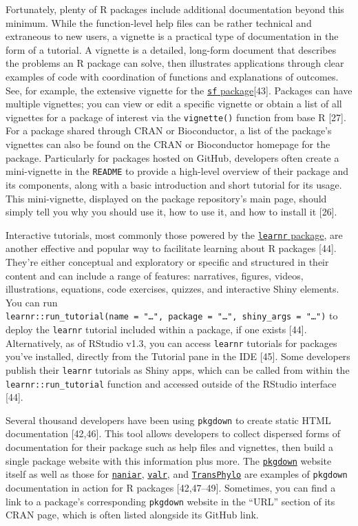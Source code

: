 \documentclass[10pt,letterpaper]{article}
\begin{document}
Fortunately, plenty of R packages include additional documentation
beyond this minimum. While the function-level help files can be rather
technical and extraneous to new users, a vignette is a practical type of
documentation in the form of a tutorial. A vignette is a detailed,
long-form document that describes the problems an R package can solve,
then illustrates applications through clear examples of code with
coordination of functions and explanations of outcomes. See, for
example, the extensive vignette for the
\href{https://cran.r-project.org/web/packages/sf/vignettes/sf1.html}{\texttt{sf}
package}{[}43{]}. Packages can have multiple vignettes; you can view or
edit a specific vignette or obtain a list of all vignettes for a package
of interest via the \texttt{vignette()} function from base R {[}27{]}.
For a package shared through CRAN or Bioconductor, a list of the
package's vignettes can also be found on the CRAN or Bioconductor
homepage for the package. Particularly for packages hosted on GitHub,
developers often create a mini-vignette in the \texttt{README} to
provide a high-level overview of their package and its components, along
with a basic introduction and short tutorial for its usage. This
mini-vignette, displayed on the package repository's main page, should
simply tell you why you should use it, how to use it, and how to install
it {[}26{]}.

Interactive tutorials, most commonly those powered by the
\href{https://rstudio.github.io/learnr/}{\texttt{learnr} package}, are
another effective and popular way to facilitate learning about R
packages {[}44{]}. They're either conceptual and exploratory or specific
and structured in their content and can include a range of features:
narratives, figures, videos, illustrations, equations, code exercises,
quizzes, and interactive Shiny elements. You can run
\texttt{learnr::run\_tutorial(name\ =\ "\ldots{}",\ package\ =\ "\ldots{}",\ shiny\_args\ =\ "\ldots{}")}
to deploy the \texttt{learnr} tutorial included within a package, if one
exists {[}44{]}. Alternatively, as of RStudio v1.3, you can access
\texttt{learnr} tutorials for packages you've installed, directly from
the Tutorial pane in the IDE {[}45{]}. Some developers publish their
\texttt{learnr} tutorials as Shiny apps, which can be called from within
the \texttt{learnr::run\_tutorial} function and accessed outside of the
RStudio interface {[}44{]}.

Several thousand developers have been using \texttt{pkgdown} to create
static HTML documentation {[}42,46{]}. This tool allows developers to
collect dispersed forms of documentation for their package such as help
files and vignettes, then build a single package website with this
information plus more. The
\href{https://pkgdown.r-lib.org/}{\texttt{pkgdown}} website itself as
well as those for
\href{http://naniar.njtierney.com/index.html}{\texttt{naniar}},
\href{https://rnabioco.github.io/valr/}{\texttt{valr}}, and
\href{https://xavierdidelot.github.io/TransPhylo/articles/TransPhylo.html}{\texttt{TransPhylo}}
are examples of \texttt{pkgdown} documentation in action for R packages
{[}42,47--49{]}. Sometimes, you can find a link to a package's
corresponding \texttt{pkgdown} website in the ``URL'' section of its
CRAN page, which is often listed alongside its GitHub link.
\end{document}
